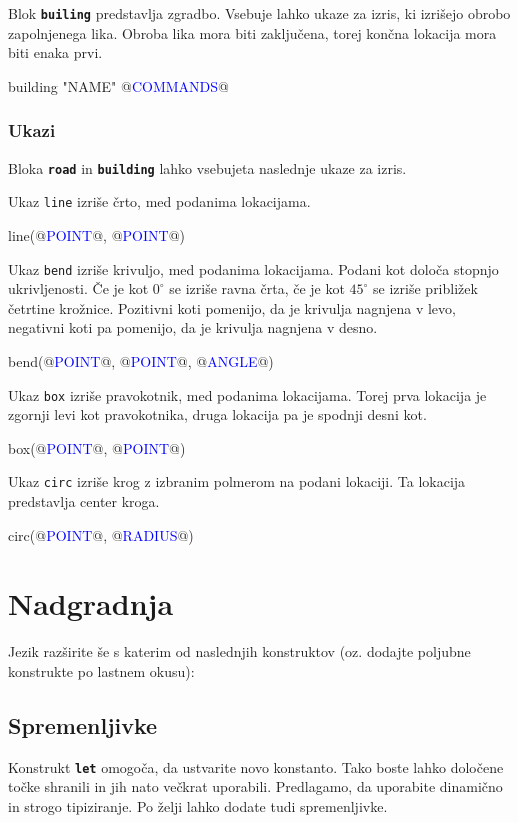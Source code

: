 \documentclass{article}
\newcommand\Var[1]{\textcolor{blue}{#1}}
\newcommand\Keyword[1]{{\textbf{\texttt{#1}}}}
\newcommand\Fun[1]{{\texttt{#1}}}
\begin{document}
Blok \Keyword{builing} predstavlja zgradbo.
Vsebuje lahko ukaze za izris, ki izrišejo obrobo zapolnjenega lika.
Obroba lika mora biti zaključena, torej končna lokacija mora biti enaka prvi.
\begin{CITY}
  building "NAME" {
    @\Var{COMMANDS}@
  }
\end{CITY}

\subsubsection{Ukazi}

Bloka \Keyword{road} in \Keyword{building} lahko vsebujeta naslednje ukaze za izris.

Ukaz \Fun{line} izriše črto, med podanima lokacijama.
\begin{CITY}
  line(@\Var{POINT}@, @\Var{POINT}@)
\end{CITY}

Ukaz \Fun{bend} izriše krivuljo, med podanima lokacijama.
Podani kot določa stopnjo ukrivljenosti.
Če je kot $0^\circ$ se izriše ravna črta, če je kot $45^\circ$ se izriše približek četrtine krožnice.
Pozitivni koti pomenijo, da je krivulja nagnjena v levo, negativni koti pa pomenijo, da je krivulja nagnjena v desno.

\begin{CITY}
  bend(@\Var{POINT}@, @\Var{POINT}@, @\Var{ANGLE}@)
\end{CITY}

Ukaz \Fun{box} izriše pravokotnik, med podanima lokacijama.
Torej prva lokacija je zgornji levi kot pravokotnika, druga lokacija pa je spodnji desni kot.
\begin{CITY}
  box(@\Var{POINT}@, @\Var{POINT}@)
\end{CITY}

Ukaz \Fun{circ} izriše krog z izbranim polmerom na podani lokaciji.
Ta lokacija predstavlja center kroga.
\begin{CITY}
  circ(@\Var{POINT}@, @\Var{RADIUS}@)
\end{CITY}

\section{Nadgradnja}
Jezik razširite še s katerim od naslednjih konstruktov (oz. dodajte poljubne konstrukte po lastnem okusu):

\subsection{Spremenljivke}
Konstrukt \Keyword{let} omogoča, da ustvarite novo konstanto.
Tako boste lahko določene točke shranili in jih nato večkrat uporabili.
Predlagamo, da uporabite dinamično in strogo tipiziranje.
Po želji lahko dodate tudi spremenljivke.
\end{document}
